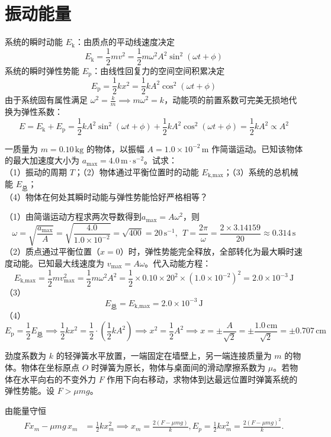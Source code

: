 
\section{振动能量}

\begin{definition}[动能与势能]
系统的瞬时动能 $E_{\text{k}}$：由质点的平动线速度决定$$E_{\text{k}} = \frac{1}{2}m v^2 = \frac{1}{2}m\omega^2 A^2 \sin^2(\omega t + \phi)$$系统的瞬时弹性势能 $E_{\text{p}}$：由线性回复力的空间空间积累决定$$E_{\text{p}} = \frac{1}{2}k x^2 = \frac{1}{2}k A^2 \cos^2(\omega t + \phi)$$由于系统固有属性满足 $\omega^2 = \frac{k}{m} \implies m\omega^2 = k$，动能项的前置系数可完美无损地代换为弹性系数：$$E = E_{\text{k}} + E_{\text{p}} = \frac{1}{2}k A^2 \sin^2(\omega t + \phi) + \frac{1}{2}k A^2 \cos^2(\omega t + \phi) =\frac{1}{2}k A^2 \propto A^2$$
\end{definition}

\begin{example}
一质量为 $m = 0.10\,\text{kg}$ 的物体，以振幅 $A = 1.0 \times 10^{-2}\,\text{m}$ 作简谐运动。已知该物体的最大加速度大小为 $a_{\text{max}} = 4.0\,\text{m}\cdot\text{s}^{-2}$。试求：\\（1）振动的周期 $T$；（2）物体通过平衡位置时的动能 $E_{\text{k,max}}$；（3）系统的总机械能 $E_{\text{总}}$；\\（4）物体在何处其瞬时动能与弹性势能恰好严格相等？
\end{example}
\begin{solution}
（1）由简谐运动方程求两次导数得到$a_{\text{max}} = A\omega^2$，则$$\omega = \sqrt{\frac{a_{\text{max}}}{A}} = \sqrt{\frac{4.0}{1.0 \times 10^{-2}}} = \sqrt{400} = 20\,\text{s}^{-1},~~T = \frac{2\pi}{\omega} = \frac{2 \times 3.14159}{20} \approx \boxed{0.314\,\text{s}}$$
（2）质点通过平衡位置（$x=0$）时，弹性势能完全释放，全部转化为最大瞬时速度动能。已知最大线速度为 $v_{\text{max}} = A\omega$。代入动能方程：$$E_{\text{k,max}} = \frac{1}{2}m v_{\text{max}}^2 = \frac{1}{2}m\omega^2 A^2= \frac{1}{2} \times 0.10 \times 20^2 \times (1.0 \times 10^{-2})^2 = \boxed{2.0 \times 10^{-3}\,\text{J}}$$
（3）$$E_{\text{总}} = E_{\text{k,max}} = \boxed{2.0 \times 10^{-3}\,\text{J}}$$
（4）$$E_{\text{p}} = \frac{1}{2}E_{\text{总}} \implies \frac{1}{2}k x^2 = \frac{1}{2} \cdot \left( \frac{1}{2}k A^2 \right)\implies x^2 = \frac{1}{2}A^2 \implies x = \pm \frac{A}{\sqrt{2}}= \pm \frac{1.0\,\text{cm}}{\sqrt{2}} = \boxed{\pm 0.707\,\text{cm}}$$
\end{solution}

\begin{exercise}
劲度系数为 \(k\) 的轻弹簧水平放置，一端固定在墙壁上，另一端连接质量为 \(m\) 的物体。物体在坐标原点 \(O\) 时弹簧为原长，物体与桌面间的滑动摩擦系数为 \(\mu\)。若物体在水平向右的不变外力 \(F\) 作用下向右移动，求物体到达最远位置时弹簧系统的弹性势能。设 \(F>\mu mg\)。
\end{exercise}
\begin{solution}
由能量守恒
\[
\begin{aligned}
Fx_m-\mu mg\,x_m&=\frac12kx_m^2
\implies x_m=\frac{2(F-\mu mg)}{k},E_p=\frac12kx_m^2=\frac{2(F-\mu mg)^2}{k}.
\end{aligned}
\]
\end{solution}

